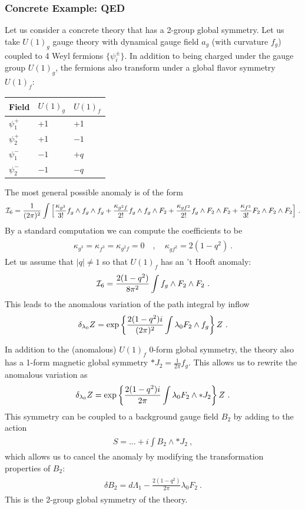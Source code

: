 \documentclass[11pt]{article}
\newcommand{\eq}[1]{\begin{align}\begin{split}#1\end{split}\end{align}}
\newcommand{\twopi}[1]{{\frac{#1}{2\pi}}}
\def\exp{{\rm exp}}
\def\CI {{\cal I}}
\def\CI {{{\cal I}}}
\begin{document}
\subsubsection{Concrete Example: QED}

\label{sec2groupex}

Let us consider a concrete theory that has a 2-group global symmetry. Let us take $U(1)_g$ gauge theory with dynamical gauge field $a_g$ (with curvature $f_g$) coupled to 4 Weyl fermions $\{\psi_i^\pm\}$. In addition to being charged under the gauge group $U(1)_g$, the fermions also transform under a global flavor symmetry $U(1)_f$:

\begin{center}
\begin{tabular}{l|l|l}
Field & $U(1)_g$ & $U(1)_f$\\
\hline
$\psi_1^+$& +1 & +1\\
$\psi_2^+$& +1 & $-1$\\
$\psi_1^-$& $-1$ & +$q$\\
$\psi_2^-$& $-1$ & $-q$
\end{tabular}
\end{center}

The most general possible anomaly is of the form 
\eq{
\CI_6=\frac{1}{(2\pi)^2}\int \Big[\frac{\kappa_{g^3}}{3!}f_g\wedge f_g\wedge f_g+\frac{\kappa_{g^2f}}{2!}f_g\wedge f_g\wedge F_2+\frac{\kappa_{gf^2}}{2!}f_g\wedge F_2\wedge F_2+\frac{\kappa_{f^3}}{3!}F_2\wedge F_2\wedge F_2\Big]~.
}
By a standard computation we can compute the coefficients to be 
\eq{
\kappa_{g^3}=\kappa_{f^3}=\kappa_{g^2f}=0\quad, \quad \kappa_{gf^2}=2(1-q^2)~.
}
Let us assume that $|q|\neq 1$ so that $U(1)_f$ has an 't Hooft anomaly:
\eq{
\CI_6=\frac{2(1-q^2)}{8\pi^2}\int  f_g\wedge F_2\wedge F_2
~.
}
This leads to the anomalous variation of the path integral by inflow 
\eq{
\delta_{\lambda_0}Z=\exp\left\{\frac{2(1-q^2)i}{(2\pi)^2}\int \lambda_0 F_2\wedge f_g\right\}Z~.
}

 In addition to the (anomalous) $U(1)_f$ 0-form global symmetry, the theory also has a 1-form magnetic global symmetry $\ast J_2=\frac{1}{2\pi}f_g.$ This allows us to rewrite the anomalous variation as 
 \eq{
\delta_{\lambda_0}Z=\exp\left\{\twopi{2(1-q^2)i}\int \lambda_0 F_2\wedge \ast J_2\right\}Z~.
 }
 This symmetry can be coupled to a  background gauge field $B_2$ by adding to the action 
\eq{
S=...+i\int B_2\wedge\ast  J_2~,
}
which allows us to cancel the anomaly by modifying the transformation properties of $B_2$:
\eq{
\delta B_2=d\Lambda_1-\twopi{2(1-q^2)}\lambda_0 F_2~.
}
This is the 2-group global symmetry of the theory. 
\end{document}
